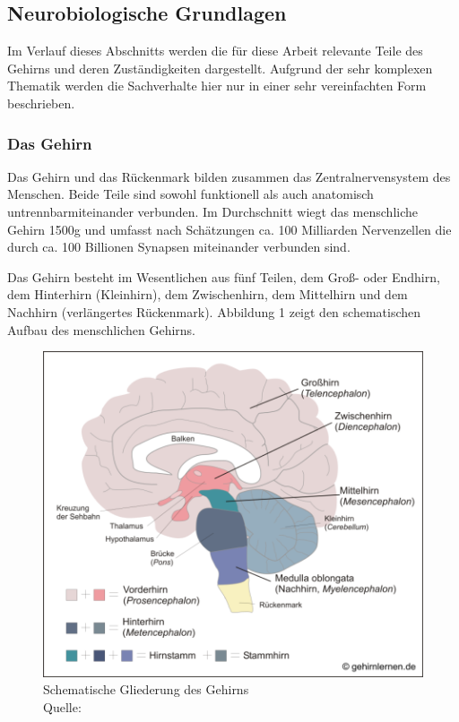 \subsection{Neurobiologische Grundlagen}
\label{sec:NeurobiologischeGrundlagen}
Im Verlauf dieses Abschnitts werden die für diese Arbeit relevante Teile des Gehirns und deren Zuständigkeiten dargestellt. Aufgrund der sehr komplexen Thematik werden die Sachverhalte hier nur in einer sehr vereinfachten Form beschrieben. 

\subsubsection{Das Gehirn}
\label{sec:dasGehirn}
Das Gehirn und das Rückenmark bilden zusammen das Zentralnervensystem des Menschen. Beide Teile sind \glqq sowohl funktionell als auch anatomisch untrennbar\grqq miteinander verbunden. \citep[S. 105]{Kirschbaum.2008} Im Durchschnitt wiegt das menschliche Gehirn 1500g und umfasst nach Schätzungen  ca. 100 Milliarden Nervenzellen die durch ca. 100 Billionen Synapsen miteinander verbunden sind. \citep{Weber.2011}

Das Gehirn besteht im Wesentlichen aus fünf Teilen, dem Groß- oder Endhirn, dem Hinterhirn (Kleinhirn), dem Zwischenhirn, dem Mittelhirn und dem Nachhirn (verlängertes Rückenmark). \citep{Schaefers.2014} Abbildung 1 zeigt den schematischen Aufbau des menschlichen Gehirns.

\begin{figure}[!h]
\centering
\includegraphics[width=0.8\linewidth]{grafiken/abb1.png}
\caption{Schematische Gliederung des Gehirns \\ Quelle: \cite{Schaefers.2014}}
\label{fig:Gehirn1}
\end{figure}


